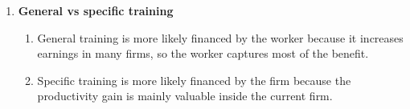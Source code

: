 \documentclass[12pt]{article}
\begin{document}
\begin{enumerate}
\begin{enumerate}[label=(\alph*)]
    Sum:
    \[
    PV_C=19{,}523.81+18{,}594.10+17{,}708.67=55{,}826.58
    \]

    \[
    \boxed{PV_C\approx \$55{,}826.58}
    \]

    \item Annual earnings gain:
    \[
    38{,}000-30{,}000=8{,}000
    \]

    \[
    \boxed{\$8{,}000}
    \]

    \item Present value of benefits at time of graduation:

    Use annuity formula:
    \[
    PV_B^{(3)}=8000\left(\frac{1-(1.05)^{-20}}{0.05}\right)
    \]

    Since
    \[
    (1.05)^{-20}\approx 0.37689
    \]
    then
    \[
    \frac{1-0.37689}{0.05}=12.4622
    \]
    so
    \[
    PV_B^{(3)}=8000(12.4622)=99{,}697.60
    \]

    \[
    \boxed{PV_B^{(3)}\approx \$99{,}697.60}
    \]

    \item Discount benefits back to the present:

    Graduation is after 3 years, so:
    \[
    PV_B^{(0)}=\frac{99{,}697.60}{(1.05)^3}
    \]
    \[
    PV_B^{(0)}=\frac{99{,}697.60}{1.157625}\approx 86{,}122.02
    \]

    \[
    \boxed{PV_B^{(0)}\approx \$86{,}122.02}
    \]

    \item NPV rule:

    \[
    NPV=PV_B^{(0)}-PV_C
    \]
    \[
    NPV=86{,}122.02-55{,}826.58=30{,}295.44
    \]

    Since \(NPV>0\), Johny should invest.

    \[
    \boxed{\text{Yes, Johny should invest in the diploma}}
    \]
\end{enumerate}


\item \textbf{General vs specific training}

\begin{enumerate}[label=(\alph*)]
    \item General training is more likely financed by the worker because it increases earnings in many firms, so the worker captures most of the benefit.

    \item Specific training is more likely financed by the firm because the productivity gain is mainly valuable inside the current firm.


\end{enumerate}
\end{enumerate}
\end{document}
